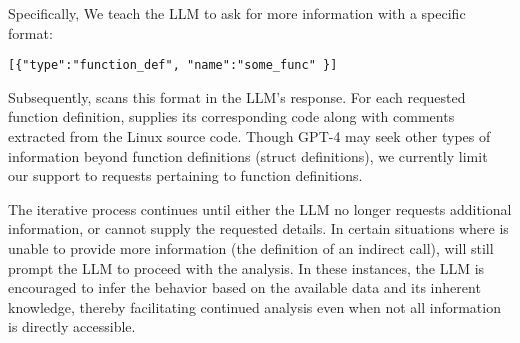 Specifically, We teach the LLM to ask for more information with a specific format:
\begin{lstlisting}[numbers=none]
    [{"type":"function_def", "name":"some_func" }]
\end{lstlisting}

Subsequently, \work scans this format in the LLM's response. For each requested function definition,
\work supplies its corresponding code along with comments extracted from the Linux source code.
Though GPT-4 may seek other types of information beyond function definitions (\eg struct definitions), we currently limit our support to requests pertaining to function definitions.

The iterative process continues until either the LLM no longer requests additional information, or \work cannot supply the requested details. In certain situations where \work is unable to provide more information (\eg the definition of an indirect call), \work will still prompt the LLM to proceed with the analysis. In these instances, the LLM is encouraged to infer the behavior based on the available data and its inherent knowledge, thereby facilitating continued analysis even when not all information is directly accessible.





